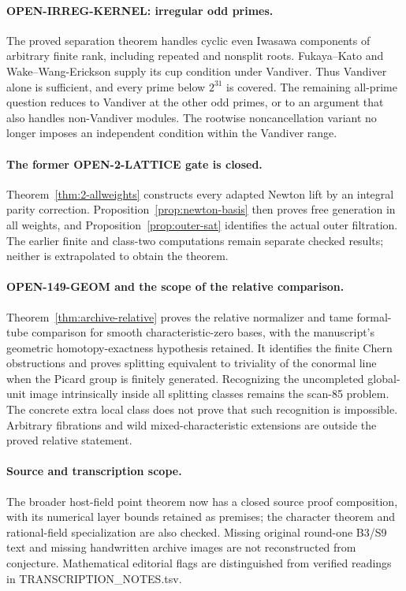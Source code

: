 \documentclass[11pt,a4paper]{article}
\theoremstyle{definition}
\begin{document}
\paragraph{OPEN-IRREG-KERNEL: irregular odd primes.}
The proved separation theorem handles cyclic even Iwasawa components of
arbitrary finite rank, including repeated and nonsplit roots.
Fukaya--Kato and Wake--Wang-Erickson supply its cup condition under
Vandiver. Thus Vandiver alone is sufficient, and every prime below
$2^{31}$ is covered. The remaining all-prime question reduces to
Vandiver at the other odd primes, or to an argument that also handles
non-Vandiver modules. The rootwise noncancellation variant no longer
imposes an independent condition within the Vandiver range.

\paragraph{The former OPEN-2-LATTICE gate is closed.}
Theorem~\ref{thm:2-allweights} constructs every adapted Newton lift
by an integral parity correction. Proposition~\ref{prop:newton-basis}
then proves free generation in all weights, and
Proposition~\ref{prop:outer-sat} identifies the actual outer filtration.
The earlier finite and class-two computations remain separate checked
results; neither is extrapolated to obtain the theorem.

\paragraph{OPEN-149-GEOM and the scope of the relative comparison.}
Theorem~\ref{thm:archive-relative} proves the relative normalizer and
tame formal-tube comparison for smooth characteristic-zero bases,
with the manuscript's geometric homotopy-exactness hypothesis retained.
It identifies the finite Chern obstructions and proves splitting
equivalent to triviality of the conormal line when the Picard group
is finitely generated. Recognizing the uncompleted global-unit image
intrinsically inside all splitting classes remains the scan-85 problem.
The concrete extra local class does not prove that such recognition
is impossible. Arbitrary fibrations and wild mixed-characteristic
extensions are outside the proved relative statement.

\paragraph{Source and transcription scope.}
The broader host-field point theorem now has a closed source proof
composition, with its numerical layer bounds retained as premises;
the character theorem and rational-field specialization are also checked. Missing original
round-one B3/S9 text and missing handwritten archive images are not
reconstructed from conjecture. Mathematical editorial flags are
distinguished from verified readings in TRANSCRIPTION\_NOTES.tsv.
\end{document}
